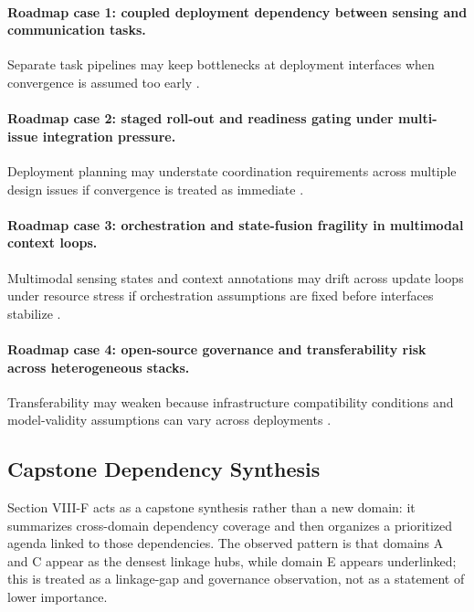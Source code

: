 \paragraph{Roadmap case 1: coupled deployment dependency between sensing and communication tasks.}
Separate task pipelines may keep bottlenecks at deployment interfaces when convergence is assumed too early \cite{O_ISAC_039}.

\paragraph{Roadmap case 2: staged roll-out and readiness gating under multi-issue integration pressure.}
Deployment planning may understate coordination requirements across multiple design issues if convergence is treated as immediate \cite{O_ISAC_163}.

\paragraph{Roadmap case 3: orchestration and state-fusion fragility in multimodal context loops.}
Multimodal sensing states and context annotations may drift across update loops under resource stress if orchestration assumptions are fixed before interfaces stabilize \cite{O_ISAC_151}.

\paragraph{Roadmap case 4: open-source governance and transferability risk across heterogeneous stacks.}
Transferability may weaken because infrastructure compatibility conditions and model-validity assumptions can vary across deployments \cite{O_ISAC_200}.

\subsection{Capstone Dependency Synthesis}

Section VIII-F acts as a capstone synthesis rather than a new domain: it summarizes cross-domain dependency coverage and then organizes a prioritized agenda linked to those dependencies. The observed pattern is that domains A and C appear as the densest linkage hubs, while domain E appears underlinked; this is treated as a linkage-gap and governance observation, not as a statement of lower importance.

